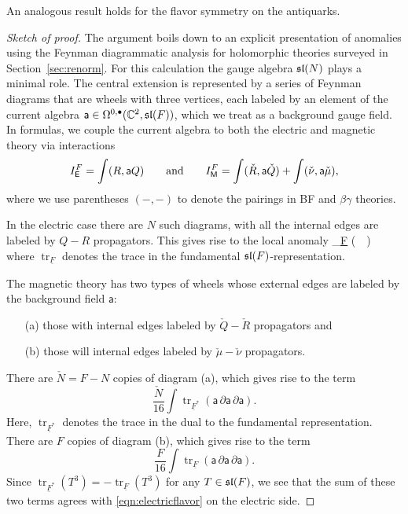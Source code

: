 \documentclass[11pt]{amsart}
\def\sfa{\mathsf{a}}
\renewcommand{\op}{\operatorname}
\begin{document}
An analogous result holds for the flavor symmetry on the antiquarks. 

\begin{proof}[Sketch of proof]
The argument boils down to an explicit presentation of anomalies using the Feynman diagrammatic analysis for holomorphic theories surveyed in Section~\ref{sec:renorm}. 
For this calculation the gauge algebra $\sl(N)$ plays a minimal role. 
The central extension is represented by a series of Feynman diagrams that are wheels with three vertices, each labeled by an element of the current algebra $\sfa \in \Omega^{0,\bu}(\CC^2, \sl(F))$, which we treat as a background gauge field.
In formulas, we couple the current algebra to both the electric and magnetic theory via interactions
\[
I^F_\sfE = \int (R, \sfa Q)  \qquad\text{and}\qquad I^F_\sfM = \int (\check{R}, \sfa \check{Q}) + \int (\check{\nu}, \sfa \check{\mu}),
\]
where we use parentheses $(-,-)$ to denote the pairings in BF and $\beta\gamma$ theories.

In the electric case there are $N$ such diagrams, with all the internal edges are labeled by $Q-R$ propagators. 
This gives rise to the local anomaly
\beqn\label{eqn:electricflavor}
  \int \op{tr}_{\underline{F}} \left(\sfa \, \partial \sfa \, \partial \sfa\right) 
\eeqn
where $\op{tr}_{\underline{F}}$ denotes the trace in the fundamental $\sl(F)$-representation.

The magnetic theory has two types of wheels whose external edges are labeled by the background field $\sfa$: 
\begin{itemize}
\item[(a)] those with  internal edges labeled by $\check{Q}-\check{R}$ propagators and 
\item[(b)] those will internal edges labeled by $\check{\mu}-\check{\nu}$ propagators. 
\end{itemize}
There are $\check{N} = F - N$ copies of diagram (a), which gives rise to the term
\[
 \frac{\check{N}}{16} \int \op{tr}_{\underline{F}^*} \left(\sfa \, \partial \sfa \, \partial \sfa\right) .
\]
Here, $\op{tr}_{\underline{F}^*}$ denotes the trace in the dual to the fundamental representation. 
There are $F$ copies of diagram (b), which gives rise to the term
\[
\frac{F}{16}\int \op{tr}_{\underline{F}} \left(\sfa\, \partial \sfa \, \partial \sfa\right).
\]
Since $\op{tr}_{\underline{F}^*} (T^3) = - \op{tr}_{\underline{F}} (T^3)$ for any $T \in \sl(F)$, 
we see that the sum of these two terms agrees with \eqref{eqn:electricflavor} on the electric side.
\end{proof}
\end{document}
